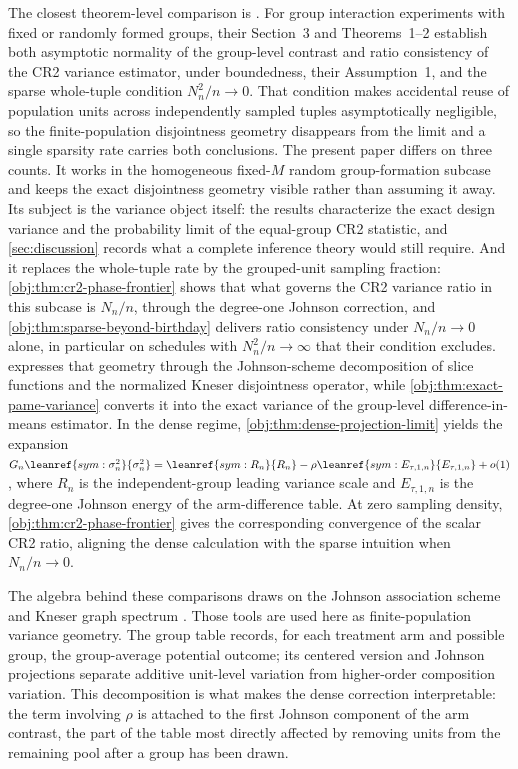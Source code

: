 \documentclass[11pt]{article}
\begin{document}
The closest theorem-level comparison is \citet{FuSamiiWang2026}. For group interaction experiments with fixed or randomly formed groups, their Section~3 and Theorems~1--2 establish both asymptotic normality of the group-level contrast and ratio consistency of the CR2 variance estimator, under boundedness, their Assumption~1, and the sparse whole-tuple condition \(N_n^2/n\to0\). That condition makes accidental reuse of population units across independently sampled tuples asymptotically negligible, so the finite-population disjointness geometry disappears from the limit and a single sparsity rate carries both conclusions. The present paper differs on three counts. It works in the homogeneous fixed-\(M\) random group-formation subcase and keeps the exact disjointness geometry visible rather than assuming it away. Its subject is the variance object itself: the results characterize the exact design variance and the probability limit of the equal-group CR2 statistic, and \cref{sec:discussion} records what a complete inference theory would still require. And it replaces the whole-tuple rate by the grouped-unit sampling fraction: \cref{obj:thm:cr2-phase-frontier} shows that what governs the CR2 variance ratio in this subcase is \(N_n/n\), through the degree-one Johnson correction, and \cref{obj:thm:sparse-beyond-birthday} delivers ratio consistency under \(N_n/n\to0\) alone, in particular on schedules with \(N_n^2/n\to\infty\) that their condition excludes.  expresses that geometry through the Johnson-scheme decomposition of slice functions and the normalized Kneser disjointness operator, while \cref{obj:thm:exact-pame-variance} converts it into the exact variance of the group-level difference-in-means estimator. In the dense regime, \cref{obj:thm:dense-projection-limit} yields the expansion \(G_n\leanref{sym:\sigma_n^2}{\ensuremath{\sigma_n^2}}=\leanref{sym:R_n}{\ensuremath{R_n}}-\rho \leanref{sym:E_{\tau,1,n}}{\ensuremath{E_{\tau,1,n}}}+o(1)\), where \(R_n\) is the independent-group leading variance scale and \(E_{\tau,1,n}\) is the degree-one Johnson energy of the arm-difference table. At zero sampling density, \cref{obj:thm:cr2-phase-frontier} gives the corresponding convergence of the scalar CR2 ratio, aligning the dense calculation with the sparse intuition when \(N_n/n\to0\).

The algebra behind these comparisons draws on the Johnson association scheme and Kneser graph spectrum \citep{Delsarte1973,BrouwerCohenNeumaier1989,Filmus2016,BrouwerEtAl2018}. Those tools are used here as finite-population variance geometry. The group table  records, for each treatment arm and possible group, the group-average potential outcome; its centered version and Johnson projections separate additive unit-level variation from higher-order composition variation. This decomposition is what makes the dense correction interpretable: the term involving \(\rho\) is attached to the first Johnson component of the arm contrast, the part of the table most directly affected by removing units from the remaining pool after a group has been drawn.
\end{document}
